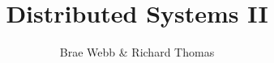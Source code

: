 \documentclass{csse4400}
\title{Distributed Systems II}
\author{Brae Webb \& Richard Thomas}
\date{\week{7}}
\begin{document}
\makecover





\end{document}
